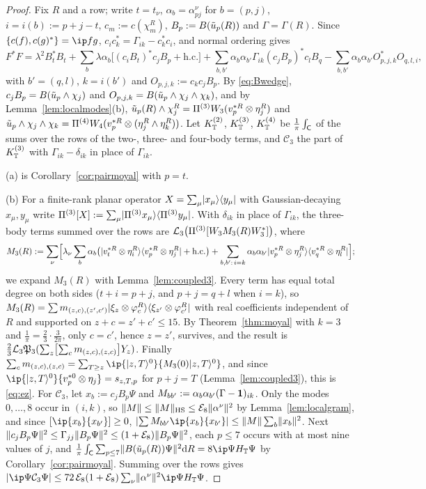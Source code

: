 \begin{proof}
Fix $R$ and a row; write $t=t_\nu$, $\alpha_b=\alpha^\nu_{pj}$ for $b=(p,j)$, $i=i(b):=p+j-t$, $c_m:=c(\chi^R_m)$, $B_p:=B(\tilde u_p(R))$ and
$\Gamma=\Gamma(R)$. Since $\{c(f),c(g)^*\}=\ip fg$, $c_ic_k^*=\Gamma_{ik}-c_k^*c_i$, and normal ordering gives
\[
F^*F=\lambda^2B_t^*B_t+\sum_b\lambda\alpha_b\bigl[(c_iB_t)^*c_jB_p+\mathrm{h.c.}\bigr]+\sum_{b,b'}\alpha_b\alpha_{b'}\Gamma_{ik}(c_jB_p)^*c_lB_q
-\sum_{b,b'}\alpha_b\alpha_{b'}O_{p,j,k}^*O_{q,l,i},
\]
with $b'=(q,l)$, $k=i(b')$ and $O_{p,j,k}:=c_kc_jB_p$. By \eqref{eq:Bwedge}, $c_jB_p=B(\tilde u_p\wedge\chi_j)$ and $O_{p,j,k}=B(\tilde u_p\wedge\chi_j\wedge\chi_k)$,
and by Lemma~\ref{lem:localmodes}(b), $\tilde u_p(R)\wedge\chi^R_j=\Pi^{(3)}W_3(v_p^{*R}\otimes\eta_j^R)$ and
$\tilde u_p\wedge\chi_j\wedge\chi_k=\Pi^{(4)}W_4(v_p^{*R}\otimes(\eta^R_j\wedge\eta^R_k))$. Let $K_{\mathbb{T}}^{(2)}$, $K_{\mathbb{T}}^{(3)}$, $K_{\mathbb{T}}^{(4)}$ be $\frac1\pi\int_{\mathsf{C}}$ of the
sums over the rows of the two-, three- and four-body terms, and $\mathcal C_3$ the part of $K_{\mathbb{T}}^{(3)}$ with $\Gamma_{ik}-\delta_{ik}$ in place
of $\Gamma_{ik}$.

(a) is Corollary~\ref{cor:pairmoyal} with $p=t$.

(b) For a finite-rank planar operator $X=\sum_\mu\lvert x_\mu\rangle\langle y_\mu\rvert$ with Gaussian-decaying $x_\mu,y_\mu$ write
$\Pi^{(3)}[X]:=\sum_\mu\lvert \Pi^{(3)}x_\mu\rangle\langle \Pi^{(3)}y_\mu\rvert$. With $\delta_{ik}$ in place of $\Gamma_{ik}$, the three-body terms summed over
the rows are $\mathcal{L}_3\bigl(\Pi^{(3)}[W_3M_3(R)W_3^*]\bigr)$, where
\[
M_3(R):=\sum_\nu\Bigl[\lambda_\nu\sum_b\alpha_b\bigl(\lvert v_t^{*R}\otimes\eta_i^R\rangle\langle v_p^{*R}\otimes\eta_j^R\rvert+\mathrm{h.c.}\bigr)
+\sum_{b,b':\,i=k}\alpha_b\alpha_{b'}\lvert v_p^{*R}\otimes\eta_j^R\rangle\langle v_q^{*R}\otimes\eta_l^R\rvert\Bigr];
\]
we expand $M_3(R)$ with Lemma~\ref{lem:coupled3}. Every term has equal total degree on both sides ($t+i=p+j$, and $p+j=q+l$ when $i=k$),
so $M_3(R)=\sum m_{(z,c),(z',c')}\lvert \xi_z\otimes\varphi_c^R\rangle\langle \xi_{z'}\otimes\varphi_{c'}^R\rvert$ with real coefficients independent of $R$ and
supported on $z+c=z'+c'\le15$. By Theorem~\ref{thm:moyal} with $k=3$ and $\frac1\pi=\frac23\cdot\frac3{2\pi}$, only $c=c'$, hence $z=z'$,
survives, and the result is $\frac23\mathcal{L}_3\mathfrak{P}_3(\sum_z\bigl[\sum_cm_{(z,c),(z,c)}\bigr]Y_z)$. Finally
$\sum_cm_{(z,c),(z,c)}=\sum_{T\ge z}\ip{\ket{z,T}^0}{M_3(0)\ket{z,T}^0}$, and since $\ip{\ket{z,T}^0}{v_p^{*0}\otimes\eta_j}=s_{z,T,p}$ for
$p+j=T$ (Lemma~\ref{lem:coupled3}), this is \eqref{eq:ez}. For $\mathcal C_3$, let $x_b:=c_jB_p\Psi$ and $M_{bb'}:=\alpha_b\alpha_{b'}(\Gamma-\mathbf{1})_{ik}$.
Only the modes $0,\dots,8$ occur in $(i,k)$, so $\lVert M\rVert\le\lVert M\rVert_{\mathrm{HS}}\le\mathcal{E}_8\lVert\alpha^\nu\rVert^2$ by Lemma~\ref{lem:localgram}, and
since $[\ip{x_b}{x_{b'}}]\ge0$, $\abs{\sum M_{bb'}\ip{x_b}{x_{b'}}}\le\norm M\sum_b\norm{x_b}^2$. Next
$\lVert c_jB_p\Psi\rVert^2\le\Gamma_{jj}\lVert B_p\Psi\rVert^2\le(1+\mathcal{E}_8)\lVert B_p\Psi\rVert^2$, each $p\le7$ occurs with at most nine values of $j$, and
$\frac1\pi\int_\cell\sum_{p\le7}\norm{B(\ut_p(R))\Psi}^2\dd R=8\ip\Psi{\HT\Psi}$ by Corollary~\ref{cor:pairmoyal}. Summing over the rows gives
$\abs{\ip\Psi{\mathcal C_3\Psi}}\le72\,\Ec_8(1+\Ec_8)\sum_\nu\norm{\alpha^\nu}^2\ip\Psi{\HT\Psi}$.


\end{proof}
